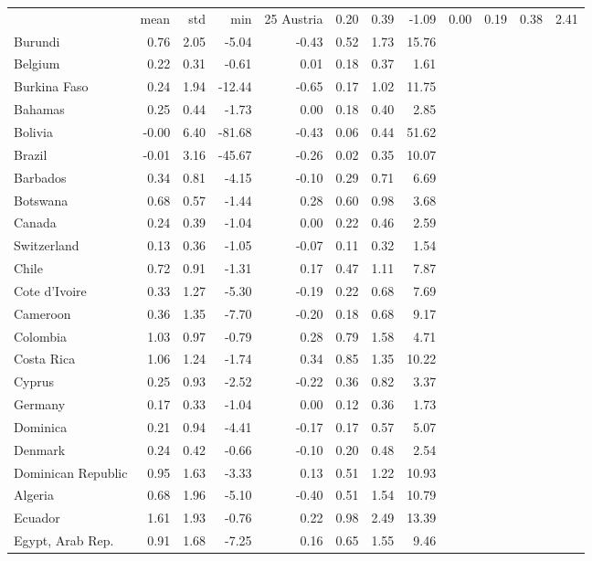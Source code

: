 \begin{tabular}{lrrrrrrr}
\toprule
 & mean & std & min & 25%
\midrule
Austria & 0.20 & 0.39 & -1.09 & 0.00 & 0.19 & 0.38 & 2.41 \\
Burundi & 0.76 & 2.05 & -5.04 & -0.43 & 0.52 & 1.73 & 15.76 \\
Belgium & 0.22 & 0.31 & -0.61 & 0.01 & 0.18 & 0.37 & 1.61 \\
Burkina Faso & 0.24 & 1.94 & -12.44 & -0.65 & 0.17 & 1.02 & 11.75 \\
Bahamas & 0.25 & 0.44 & -1.73 & 0.00 & 0.18 & 0.40 & 2.85 \\
Bolivia & -0.00 & 6.40 & -81.68 & -0.43 & 0.06 & 0.44 & 51.62 \\
Brazil & -0.01 & 3.16 & -45.67 & -0.26 & 0.02 & 0.35 & 10.07 \\
Barbados & 0.34 & 0.81 & -4.15 & -0.10 & 0.29 & 0.71 & 6.69 \\
Botswana & 0.68 & 0.57 & -1.44 & 0.28 & 0.60 & 0.98 & 3.68 \\
Canada & 0.24 & 0.39 & -1.04 & 0.00 & 0.22 & 0.46 & 2.59 \\
Switzerland & 0.13 & 0.36 & -1.05 & -0.07 & 0.11 & 0.32 & 1.54 \\
Chile & 0.72 & 0.91 & -1.31 & 0.17 & 0.47 & 1.11 & 7.87 \\
Cote d'Ivoire & 0.33 & 1.27 & -5.30 & -0.19 & 0.22 & 0.68 & 7.69 \\
Cameroon & 0.36 & 1.35 & -7.70 & -0.20 & 0.18 & 0.68 & 9.17 \\
Colombia & 1.03 & 0.97 & -0.79 & 0.28 & 0.79 & 1.58 & 4.71 \\
Costa Rica & 1.06 & 1.24 & -1.74 & 0.34 & 0.85 & 1.35 & 10.22 \\
Cyprus & 0.25 & 0.93 & -2.52 & -0.22 & 0.36 & 0.82 & 3.37 \\
Germany & 0.17 & 0.33 & -1.04 & 0.00 & 0.12 & 0.36 & 1.73 \\
Dominica & 0.21 & 0.94 & -4.41 & -0.17 & 0.17 & 0.57 & 5.07 \\
Denmark & 0.24 & 0.42 & -0.66 & -0.10 & 0.20 & 0.48 & 2.54 \\
Dominican Republic & 0.95 & 1.63 & -3.33 & 0.13 & 0.51 & 1.22 & 10.93 \\
Algeria & 0.68 & 1.96 & -5.10 & -0.40 & 0.51 & 1.54 & 10.79 \\
Ecuador & 1.61 & 1.93 & -0.76 & 0.22 & 0.98 & 2.49 & 13.39 \\
Egypt, Arab Rep. & 0.91 & 1.68 & -7.25 & 0.16 & 0.65 & 1.55 & 9.46 \\

\end{tabular}
